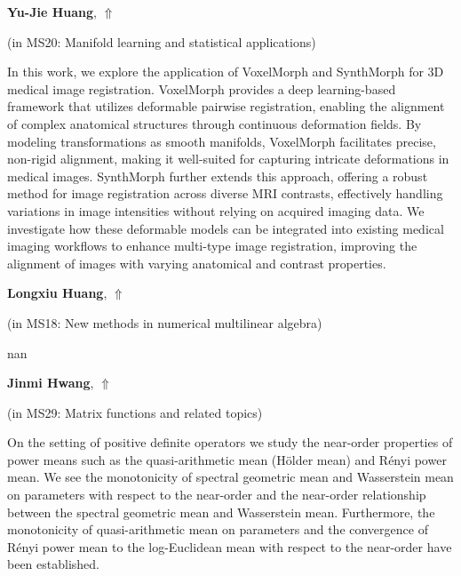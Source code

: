 \documentclass[ILAS2025-program.tex]{subfiles}
\begin{document}
\hypertarget{down0151}{}\begin{ilasabstract}
    
\textbf{Yu-Jie Huang},  \hfill \hyperlink{up0151}{$\Uparrow$}
    
    
(in {\color{mstitle}MS20: Manifold learning and statistical applications})
        
\mtskip
    In this work, we explore the application of VoxelMorph and SynthMorph for 3D medical image registration. VoxelMorph provides a deep learning-based framework that utilizes deformable pairwise registration, enabling the alignment of complex anatomical structures through continuous deformation fields. By modeling transformations as smooth manifolds, VoxelMorph facilitates precise, non-rigid alignment, making it well-suited for capturing intricate deformations in medical images. SynthMorph further extends this approach, offering a robust method for image registration across diverse MRI contrasts, effectively handling variations in image intensities without relying on acquired imaging data. We investigate how these deformable models can be integrated into existing medical imaging workflows to enhance multi-type image registration, improving the alignment of images with varying anatomical and contrast properties.
\end{ilasabstract}
    

\hypertarget{down0191}{}\begin{ilasabstract}
    
\textbf{Longxiu Huang},  \hfill \hyperlink{up0191}{$\Uparrow$}
    
    
(in {\color{mstitle}MS18: New methods in numerical multilinear algebra})
        
\mtskip
    nan
\end{ilasabstract}
    

\hypertarget{down0015}{}\begin{ilasabstract}
    
\textbf{Jinmi Hwang},  \hfill \hyperlink{up0015}{$\Uparrow$}
    
    
(in {\color{mstitle}MS29: Matrix functions and related topics})
        
\mtskip
    On the setting of positive definite operators we study the near-order properties of power means such as the quasi-arithmetic mean (H\"{o}lder mean) and R\'{e}nyi power mean. We see the monotonicity of spectral geometric mean and Wasserstein mean on parameters with respect to the near-order and the near-order relationship between the spectral geometric mean and Wasserstein mean. Furthermore, the monotonicity of quasi-arithmetic mean on parameters and the convergence of R\'{e}nyi power mean to the log-Euclidean mean with respect to the near-order have been established.
\end{ilasabstract}
    
\end{document}
